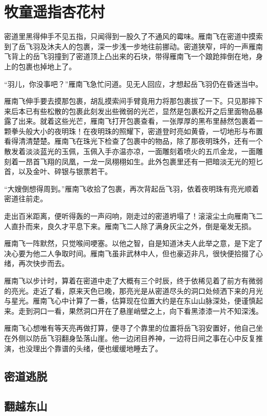 
\chapter{牧童遥指杏花村}
\label{chap:mu-tong-yao-zhi-xing-hua-cun}

密道里黑得伸手不见五指，只闻得到一股久了不通风的霉味。雁南飞在密道中摸索到了岳飞羽及沐夫人的包裹，深一步浅一步地往前挪动。密道狭窄，呯的一声雁南飞背上的岳飞羽撞到了密道顶上凸出来的石块，带得雁南飞一个踉跄摔倒在地，身上的包裹也掉地上了。

“羽儿，你没事吧？”雁南飞急忙问道。见无人回应，才想起岳飞羽仍在昏迷当中。

雁南飞伸手要去摸那包裹，胡乱摸索间手臂竟用力将那包裹拔了一下。只见那摔下来后本已有些松散的包裹此刻发出些微弱的光芒，显然是包裹松开之后里面物品暴露了出来。就着这些光芒，雁南飞打开包裹查看，一张厚厚的黑布里赫然包裹着一颗拳头般大小的夜明珠！在夜明珠的照耀下，密道登时亮如黄昏，一切地形与布置看得清清楚楚。雁南飞在珠光下检查了包裹中的物品，除了那夜明珠外，还有一个散发着淡淡蓝光的玉佩，玉佩入手亦温亦凉，一面雕刻着喷火的五爪金龙，一面雕刻着一昂首飞翔的凤凰，一龙一凤栩栩如生。此外包裹里还有一把暗淡无光的短匕首，以及金叶、碎银与银票若干。

“大嫂倒想得周到。”雁南飞收拾了包裹，再次背起岳飞羽，依着夜明珠有亮光顺着密道往前走。

走出百米距离，便听得轰的一声闷响，刚走过的密道坍塌了！滚滚尘土向雁南飞二人直扑而来，良久才平息下来。雁南飞二人除了满身灰尘之外，倒是毫发无损。

雁南飞一阵默然，只觉喉间哽塞。以他之智，自是知道沐夫人此举之意，是下定了决心要为他二人争取时间。雁南飞虽非武林中人，但也豪迈非凡，很快便拾掇了心绪，再次快步而去。

雁南飞以步计时，算着在密道中走了大概有三个时辰，终于依稀见着了前方有微弱的亮光。走近了看，原来天色已晚，那亮光是从密道尽头的洞口处倾洒下来的月光与星光。雁南飞心中计算了一番，估算现在位置大约是在东山山脉深处，便谨慎起来。走到洞口一看，果然洞口开在了悬崖峭壁之上，向下看黑漆漆一片不知深浅。

雁南飞心想唯有等天亮再做打算，便寻了个靠里的位置将岳飞羽安置好，他自己坐在外侧以防岳飞羽翻身坠落山崖。他一边闭目养神，一边将日间之事在心中反复推演，也没理出个靠谱的头绪，便也缓缓地睡去了。




\section{密道逃脱}


\section{翻越东山}
